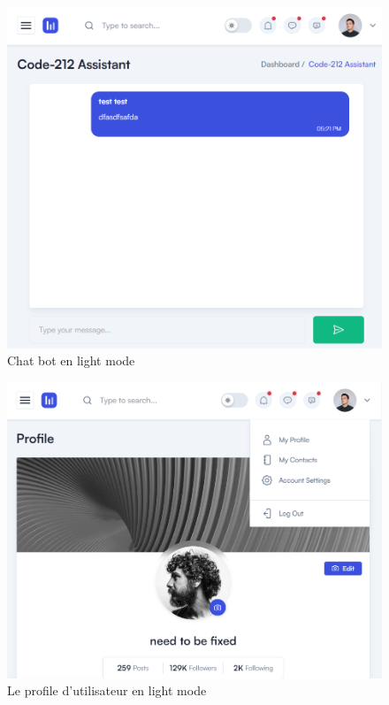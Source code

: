 \documentclass[a4paper, 11pt, openany]{report}
\begin{document}
\begin{figure}
\centering
\includegraphics[width=\textwidth]{light-chat.png} 
\caption{Chat bot en light mode}
\label{fig:lightchat}
\end{figure}


\begin{figure}
\centering
\includegraphics[width=\textwidth]{light-profile.png} 
\caption{Le profile d'utilisateur en light mode}
\label{fig:profile}
\end{figure}
\end{document}
